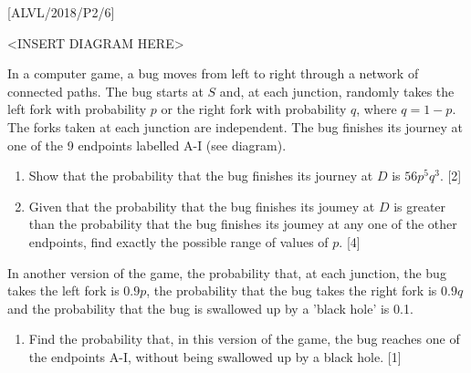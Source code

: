 \item {[}ALVL/2018/P2/6{]}
\noindent \begin{center}
\textless INSERT DIAGRAM HERE\textgreater{}
\par\end{center}

In a computer game, a bug moves from left to right through a network
of connected paths. The bug starts at $S$ and, at each junction,
randomly takes the left fork with probability $p$ or the right fork
with probability $q$, where $q=1-p$. The forks taken at each junction
are independent. The bug finishes its journey at one of the 9 endpoints
labelled A-I (see diagram). 
\begin{enumerate}
\item Show that the probability that the bug finishes its journey at $D$
is $56p^{5}q^{3}$.\hfill{} {[}2{]}
\item Given that the probability that the bug finishes its joumey at $D$
is greater than the probability that the bug finishes its joumey at
any one of the other endpoints, find exactly the possible range of
values of $p$. \hfill{}{[}4{]}
\end{enumerate}
In another version of the game, the probability that, at each junction,
the bug takes the left fork is $0.9p$, the probability that the bug
takes the right fork is $0.9q$ and the probability that the bug is
swallowed up by a 'black hole\textquoteright{} is 0.1. 
\begin{enumerate}
\item Find the probability that, in this version of the game, the bug reaches
one of the endpoints A-I, without being swallowed up by a black hole.
\hfill{}{[}1{]}
\end{enumerate}
